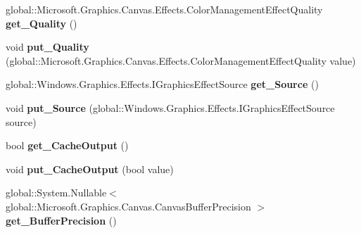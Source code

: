 \begin{DoxyCompactItemize}
global\+::\+Microsoft.\+Graphics.\+Canvas.\+Effects.\+Color\+Management\+Effect\+Quality {\bfseries get\+\_\+\+Quality} ()
\item 
\mbox{\label{class_microsoft_1_1_graphics_1_1_canvas_1_1_effects_1_1_color_management_effect_a4316f7588b101afd626da8698742b520}} 
void {\bfseries put\+\_\+\+Quality} (global\+::\+Microsoft.\+Graphics.\+Canvas.\+Effects.\+Color\+Management\+Effect\+Quality value)
\item 
\mbox{\label{class_microsoft_1_1_graphics_1_1_canvas_1_1_effects_1_1_color_management_effect_a9670ef40f037787138a9f7733b34edc3}} 
global\+::\+Windows.\+Graphics.\+Effects.\+I\+Graphics\+Effect\+Source {\bfseries get\+\_\+\+Source} ()
\item 
\mbox{\label{class_microsoft_1_1_graphics_1_1_canvas_1_1_effects_1_1_color_management_effect_a64b0b058d7f8bf487791409141270602}} 
void {\bfseries put\+\_\+\+Source} (global\+::\+Windows.\+Graphics.\+Effects.\+I\+Graphics\+Effect\+Source source)
\item 
\mbox{\label{class_microsoft_1_1_graphics_1_1_canvas_1_1_effects_1_1_color_management_effect_a20c5884547307142f41adb0bfd16ab29}} 
bool {\bfseries get\+\_\+\+Cache\+Output} ()
\item 
\mbox{\label{class_microsoft_1_1_graphics_1_1_canvas_1_1_effects_1_1_color_management_effect_a18b489137883ce9492e9aaf73e430cfa}} 
void {\bfseries put\+\_\+\+Cache\+Output} (bool value)
\item 
\mbox{\label{class_microsoft_1_1_graphics_1_1_canvas_1_1_effects_1_1_color_management_effect_ad75bce97e7aa6d28ff473016910c2f71}} 
global\+::\+System.\+Nullable$<$ global\+::\+Microsoft.\+Graphics.\+Canvas.\+Canvas\+Buffer\+Precision $>$ {\bfseries get\+\_\+\+Buffer\+Precision} ()
\item 
\mbox{\label{class_microsoft_1_1_graphics_1_1_canvas_1_1_effects_1_1_color_management_effect_a4c78899176800a831d78c8f1f763ff19}} 

\end{DoxyCompactItemize}
